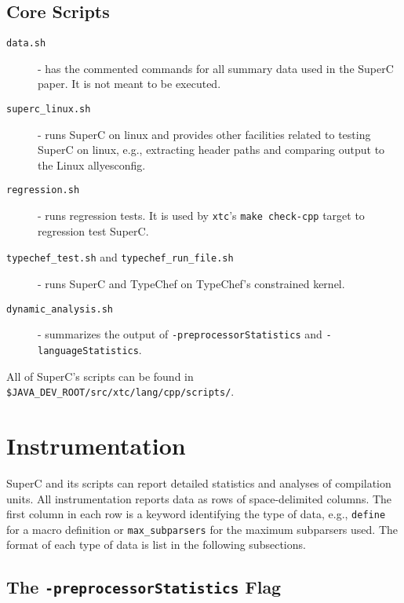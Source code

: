 \documentclass{article}
\newcommand{\SuperC}{{\textsf{Su\-perC}}}
\begin{document}
\subsection{Core Scripts}

\begin{description}
\item[\texttt{data.sh}] - has the commented commands for all summary
  data used in the \SuperC{} paper.  It is not meant to be executed.

\item[\texttt{superc\_linux.sh}] - runs \SuperC{} on linux and
  provides other facilities related to testing \SuperC{} on linux,
  e.g., extracting header paths and comparing output to the Linux
  allyesconfig.

\item[\texttt{regression.sh}] - runs regression tests.  It is used by
  \verb"xtc"'s \verb"make check-cpp" target to regression test
  \SuperC{}.

\item[\texttt{typechef\_test.sh} and \texttt{typechef\_run\_file.sh}]
  - runs \SuperC{} and TypeChef on TypeChef's constrained kernel.

\item[\texttt{dynamic\_analysis.sh}] - summarizes the output of
  \texttt{-preprocessorStatistics} and \texttt{-languageStatistics}.


\end{description}

All of \SuperC{}'s scripts can be found in
\verb"$JAVA_DEV_ROOT/src/xtc/lang/cpp/scripts/".


\section{Instrumentation}

\SuperC{} and its scripts can report detailed statistics and analyses
of compilation units.  All instrumentation reports data as rows of
space-delimited columns.  The first column in each row is a keyword
identifying the type of data, e.g., \verb"define" for a macro
definition or \verb"max_subparsers" for the maximum subparsers used.
The format of each type of data is list in the following subsections.

\subsection{The \texttt{-preprocessorStatistics} Flag}
\end{document}
